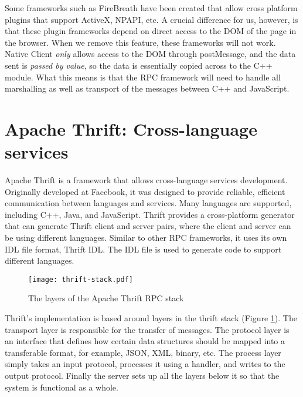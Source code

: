 Some frameworks such as FireBreath\cite{firebreath} have been created that allow cross platform plugins that support ActiveX, NPAPI, etc. A crucial difference for us, however, is that these plugin frameworks depend on direct access to the DOM of the page in the browser. When we remove this feature, these frameworks will not work. Native Client \emph{only} allows access to the DOM through postMessage, and the data sent is \emph{passed by value}, so the data is essentially copied across to the C++ module. What this means is that the RPC framework will need to handle all marshalling as well as transport of the messages between C++ and JavaScript.




\section{Apache Thrift: Cross-language services} %
\label{sec:apache_thrift_cross_language_services}
Apache Thrift is a framework that allows cross-language services development. Originally developed at Facebook, it was designed to provide reliable, efficient communication between languages and services. Many languages are supported, including C++, Java, and JavaScript. Thrift provides a cross-platform generator that can generate Thrift client and server pairs, where the client and server can be using different languages. Similar to other RPC frameworks, it uses its own IDL file format, Thrift IDL. The IDL file is used to generate code to support different languages.

\begin{figure}
    \centering
    \texttt{[image: thrift-stack.pdf]} 
    \caption{The layers of the Apache Thrift RPC stack}
    \label{fig:thrift-stack}
\end{figure}

Thrift's implementation is based around layers in the thrift stack (Figure \ref{fig:thrift-stack}). The transport layer is responsible for the transfer of messages. The protocol layer is an interface that defines how certain data structures should be mapped into a transferable format, for example, JSON, XML, binary, etc. The process layer simply takes an input protocol, processes it using a handler, and writes to the output protocol. Finally the server sets up all the layers below it so that the system is functional as a whole.

